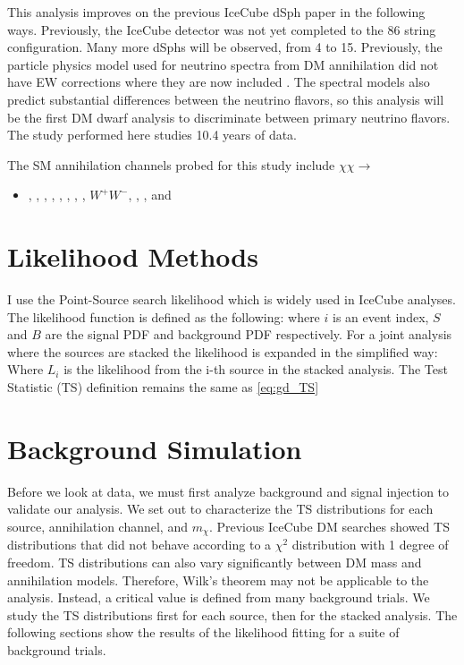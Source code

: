 This analysis improves on the previous IceCube dSph paper \cite{IC3_DM2013} in the following ways.
Previously, the IceCube detector was not yet completed to the 86 string configuration.
Many more dSphs will be observed, from 4 to 15.
Previously, the particle physics model used for neutrino spectra from DM annihilation did not have EW corrections where they are now included \cite{HDMSpectra}.
The spectral models also predict substantial differences between the neutrino flavors, so this analysis will be the first DM dwarf analysis to discriminate between primary neutrino flavors.
The study performed here studies 10.4 years of data.

The SM annihilation channels probed for this study include $\chi\chi \rightarrow$
\begin{itemize}
    \item[] , , , , , \parpar{\mu}, \parpar{\tau}, , $W^+W^-$, , \parpar{\nu_\mu}, and \parpar{\nu_\tau}
\end{itemize}

\section{Likelihood Methods}\label{sec:icDM_LLH}

I use the Point-Source search likelihood which is widely used in IceCube analyses.
The likelihood function is defined as the following:
\icPtSrcLLH
where  $ i $ is an event index, $S$ and $B$ are the signal PDF and background PDF respectively. For a joint analysis where the sources are stacked the likelihood is expanded in the simplified way:
\icStackLLH
Where $ L_i $ is the likelihood from the i-th source in the stacked analysis.
The Test Statistic (TS) definition remains the same as \cref{eq:gd_TS}

\section{Background Simulation}\label{sec:icDM_bkgd_sim}

Before we look at data, we must first analyze background and signal injection to validate our analysis.
We set out to characterize the TS distributions for each source, annihilation channel, and $m_\chi$.
Previous IceCube DM searches \cite{Minjin_icrc23,IC3_nulines} showed TS distributions that did not behave according to a $\chi^2$ distribution with 1 degree of freedom.
TS distributions can also vary significantly between DM mass and annihilation models.
Therefore, Wilk's theorem may not be applicable to the analysis.
Instead, a critical value is defined from many background trials.
We study the TS distributions first for each source, then for the stacked analysis.
The following sections show the results of the likelihood fitting for a suite of background trials.

